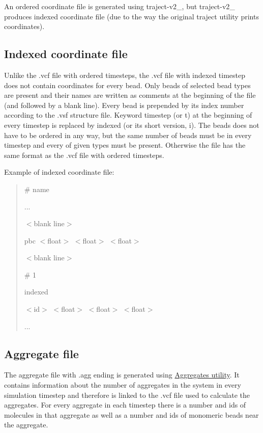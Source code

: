 An ordered coordinate file is generated using {\ttfamily traject-\/v2\+\_}, but {\ttfamily traject-\/v2\+\_} produces indexed coordinate file (due to the way the original {\ttfamily traject} utility prints coordinates).\hypertarget{InputFiles_IndexedCoorFile}{}\subsection{Indexed coordinate file }\label{InputFiles_IndexedCoorFile}
Unlike the {\ttfamily .vcf} file with ordered timesteps, the {\ttfamily .vcf} file with indexed timestep does not contain coordinates for every bead. Only beads of selected bead types are present and their names are written as comments at the beginning of the file (and followed by a blank line). Every bead is prepended by its index number according to the {\ttfamily .vsf} structure file. Keyword {\ttfamily timestep} (or {\ttfamily t}) at the beginning of every timestep is replaced by {\ttfamily indexed} (or its short version, {\ttfamily i}). The beads does not have to be ordered in any way, but the same number of beads must be in every timestep and every of given types must be present. Otherwise the file has the same format as the {\ttfamily .vcf} file with ordered timesteps.

Example of indexed coordinate file\+:

\begin{quote}
{\ttfamily \# name}

{\ttfamily ...}

{\ttfamily $<$blank line$>$}

{\ttfamily pbc $<$float$>$ $<$float$>$ $<$float$>$}

{\ttfamily $<$blank line$>$}

{\ttfamily \# 1}

{\ttfamily indexed}

{\ttfamily $<$id$>$ $<$float$>$ $<$float$>$ $<$float$>$}

{\ttfamily ...} \end{quote}
\hypertarget{InputFiles_AggregateFile}{}\subsection{Aggregate file }\label{InputFiles_AggregateFile}
The aggregate file with {\ttfamily .agg} ending is generated using \hyperlink{Common_Aggregates}{Aggregates utility}. It contains information about the number of aggregates in the system in every simulation timestep and therefore is linked to the {\ttfamily .vcf} file used to calculate the aggregates. For every aggregate in each timestep there is a number and ids of molecules in that aggregate as well as a number and ids of monomeric beads near the aggregate.

